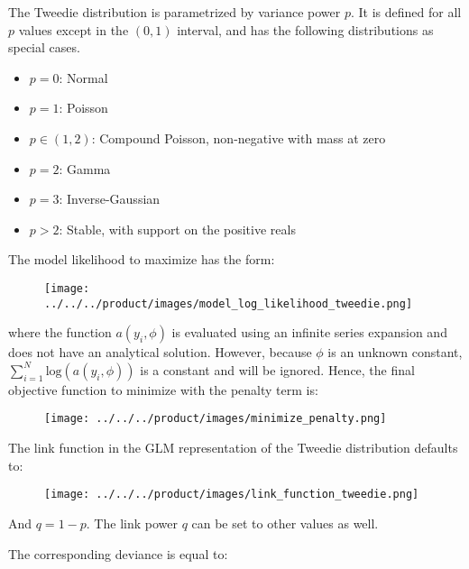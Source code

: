 The Tweedie distribution is parametrized by variance power $p$. It is defined for all $p$ values except in the $(0,1)$ interval, and has the following distributions as special cases.

\begin{itemize}
\item  $p=0$: Normal
\item  $p=1$: Poisson
\item $p\in(1, 2)$: Compound Poisson, non-negative with mass at zero
\item $p=2$: Gamma
\item $p=3$: Inverse-Gaussian
\item $p>2$:  Stable, with support on the positive reals %
\end{itemize}

\waterExampleInR


\newpage
\waterExampleInPython


The model likelihood to maximize has the form:

\begin{figure}[H]
\centering
\texttt{[image: ../../../product/images/model\_log\_likelihood\_tweedie.png]}
\end{figure}

where the function $a(y_i,\phi)$ is evaluated using an infinite series expansion and does not have an analytical solution. However, because $\phi$ is an unknown constant, $\sum_{i=1}^N\text{log}(a(y_i,\phi))$ is a constant and will be ignored. Hence, the final objective function to minimize with the penalty term is:

\begin{figure}[H]
\centering
\texttt{[image: ../../../product/images/minimize\_penalty.png]}
\end{figure}

The link function in the GLM representation of the Tweedie distribution defaults to:

\begin{figure}[H]
\centering
\texttt{[image: ../../../product/images/link\_function\_tweedie.png]}
\end{figure}

And $q = 1 - p$. The link power $q$ can be set to other values as well.

The corresponding deviance is equal to:

